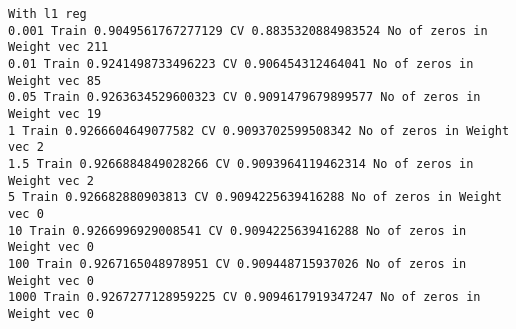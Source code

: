 \documentclass[11pt]{article}
\begin{document}
    \begin{Verbatim}[commandchars=\\\{\}]
With l1 reg
0.001 Train 0.9049561767277129 CV 0.8835320884983524 No of zeros in Weight vec 211
0.01 Train 0.9241498733496223 CV 0.906454312464041 No of zeros in Weight vec 85
0.05 Train 0.9263634529600323 CV 0.9091479679899577 No of zeros in Weight vec 19
1 Train 0.9266604649077582 CV 0.9093702599508342 No of zeros in Weight vec 2
1.5 Train 0.9266884849028266 CV 0.9093964119462314 No of zeros in Weight vec 2
5 Train 0.926682880903813 CV 0.9094225639416288 No of zeros in Weight vec 0
10 Train 0.9266996929008541 CV 0.9094225639416288 No of zeros in Weight vec 0
100 Train 0.9267165048978951 CV 0.909448715937026 No of zeros in Weight vec 0
1000 Train 0.9267277128959225 CV 0.9094617919347247 No of zeros in Weight vec 0

    \end{Verbatim}
\end{document}
